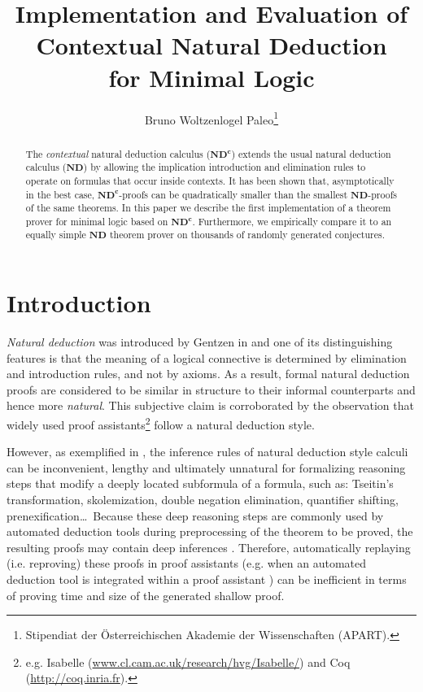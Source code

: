 \documentclass{llncs}
\title{
  Implementation and Evaluation of \\ 
  Contextual Natural Deduction \\
  for Minimal Logic
}
\author{
  Bruno Woltzenlogel Paleo\thanks{Stipendiat der \"Osterreichischen Akademie der Wissenschaften (APART).}%
}
\institute{
  Vienna University of Technology \\
  Australian National University \\
  \email{bruno.wp@gmail.com}
}
\begin{document}
\maketitle

\newcommand{\ND}{$\textbf{ND}$\xspace}
\newcommand{\NDd}{$\textbf{ND}^\textbf{c}$\xspace}
\newcommand{\lc}{\lambda^c}

\begin{abstract}
The \emph{contextual} natural deduction calculus ({\NDd}) extends the usual natural deduction calculus ({\ND}) by allowing the implication introduction and elimination rules to operate on formulas that occur inside contexts. It has been shown that, asymptotically in the best case, {\NDd}-proofs can be quadratically smaller than the smallest {\ND}-proofs of the same theorems. In this paper we describe the first implementation of a theorem prover for minimal logic based on {\NDd}. Furthermore, we empirically compare it to an equally simple {\ND} theorem prover on thousands of randomly generated conjectures.
\end{abstract}


\section{Introduction}

\emph{Natural deduction} was introduced by Gentzen in \cite{Gentzen1934Untersuchungen-uber-das-logische-Schliesen} and one of its distinguishing features is that the meaning of a logical connective is determined by elimination and introduction rules, and not by axioms. As a result, formal natural deduction proofs are considered to be similar in structure to their informal counterparts and hence more \emph{natural}. This subjective claim is corroborated by the observation that widely used proof assistants\footnote{e.g. Isabelle {\scriptsize (\url{www.cl.cam.ac.uk/research/hvg/Isabelle/})} and Coq {\scriptsize (\url{http://coq.inria.fr})}.} 
follow a natural deduction style.

However, as exemplified in \cite{NDc}, the inference rules of natural deduction style calculi can be inconvenient, lengthy and ultimately unnatural for formalizing reasoning steps that modify a deeply located subformula of a formula, such as: Tseitin's transformation, skolemization, double negation elimination, quantifier shifting, prenexification\ldots  \ Because these deep reasoning steps are commonly used by automated deduction tools during preprocessing of the theorem to be proved, the resulting proofs may contain deep inferences \cite{DeharbeFontaineWoltzenlogel-Paleo2011Quantifier-Inference-Rules-in-the-Proof-Format-of-VeriT}. Therefore, automatically replaying (i.e. reproving) these proofs in proof assistants (e.g. when an automated deduction tool is integrated within a proof assistant \cite{BohmeNipkow2010Sledgehammer:-Judgement-Day}) can be inefficient in terms of proving time and size of the generated shallow proof.
\end{document}
